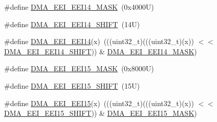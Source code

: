 \begin{DoxyCompactItemize}
\item 
\#define \mbox{\hyperlink{group___d_m_a___register___masks_ga17910b22c3157c4563e8542cb7b6474b}{D\+M\+A\+\_\+\+E\+E\+I\+\_\+\+E\+E\+I14\+\_\+\+M\+A\+SK}}~(0x4000\+U)
\item 
\#define \mbox{\hyperlink{group___d_m_a___register___masks_gafd0dee555d66de9f6d01b314dac35d36}{D\+M\+A\+\_\+\+E\+E\+I\+\_\+\+E\+E\+I14\+\_\+\+S\+H\+I\+FT}}~(14\+U)
\item 
\#define \mbox{\hyperlink{group___d_m_a___register___masks_gae30106020ea06d07695c58e947fd1a8f}{D\+M\+A\+\_\+\+E\+E\+I\+\_\+\+E\+E\+I14}}(x)~(((uint32\+\_\+t)(((uint32\+\_\+t)(x)) $<$$<$ \mbox{\hyperlink{group___d_m_a___register___masks_gafd0dee555d66de9f6d01b314dac35d36}{D\+M\+A\+\_\+\+E\+E\+I\+\_\+\+E\+E\+I14\+\_\+\+S\+H\+I\+FT}})) \& \mbox{\hyperlink{group___d_m_a___register___masks_ga17910b22c3157c4563e8542cb7b6474b}{D\+M\+A\+\_\+\+E\+E\+I\+\_\+\+E\+E\+I14\+\_\+\+M\+A\+SK}})
\item 
\#define \mbox{\hyperlink{group___d_m_a___register___masks_ga20dcfe45845f35970fa27f06f10c52a3}{D\+M\+A\+\_\+\+E\+E\+I\+\_\+\+E\+E\+I15\+\_\+\+M\+A\+SK}}~(0x8000\+U)
\item 
\#define \mbox{\hyperlink{group___d_m_a___register___masks_ga442bb0da667094767c2f8acc8fc5f4e7}{D\+M\+A\+\_\+\+E\+E\+I\+\_\+\+E\+E\+I15\+\_\+\+S\+H\+I\+FT}}~(15\+U)
\item 
\#define \mbox{\hyperlink{group___d_m_a___register___masks_gadc79380b1d77f658583b7224f5c95851}{D\+M\+A\+\_\+\+E\+E\+I\+\_\+\+E\+E\+I15}}(x)~(((uint32\+\_\+t)(((uint32\+\_\+t)(x)) $<$$<$ \mbox{\hyperlink{group___d_m_a___register___masks_ga442bb0da667094767c2f8acc8fc5f4e7}{D\+M\+A\+\_\+\+E\+E\+I\+\_\+\+E\+E\+I15\+\_\+\+S\+H\+I\+FT}})) \& \mbox{\hyperlink{group___d_m_a___register___masks_ga20dcfe45845f35970fa27f06f10c52a3}{D\+M\+A\+\_\+\+E\+E\+I\+\_\+\+E\+E\+I15\+\_\+\+M\+A\+SK}})
\end{DoxyCompactItemize}

